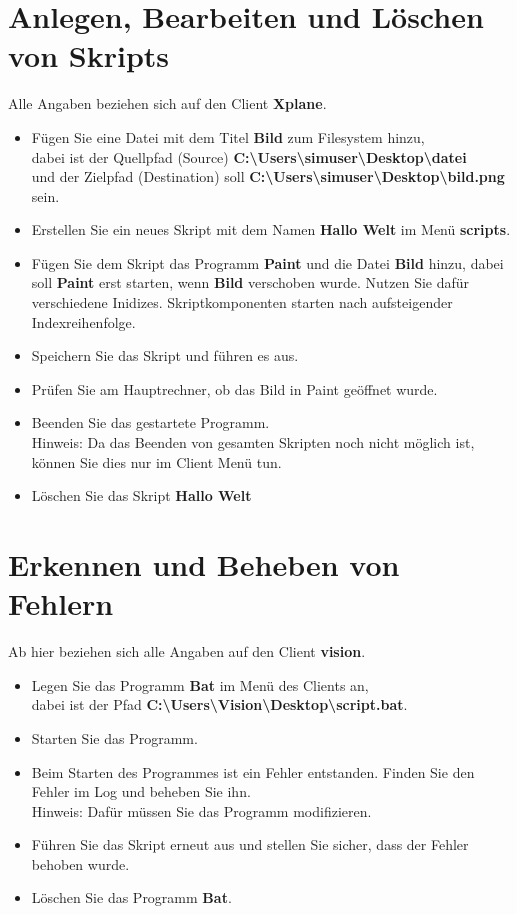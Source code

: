 \documentclass[accentcolor=tud1a,11pt]{tudexercise}
\begin{document}
\nutzerstudie
\section*{Anlegen, Bearbeiten und Löschen von Skripts}
Alle Angaben beziehen sich auf den Client \textbf{Xplane}.
\begin{itemize}
	\item Fügen Sie eine Datei mit dem Titel \textbf{Bild} zum Filesystem hinzu, \\
		dabei ist der Quellpfad (Source) \textbf{C:\textbackslash Users\textbackslash simuser\textbackslash Desktop\textbackslash datei} \\ 
		und der Zielpfad (Destination) soll \textbf{C:\textbackslash Users\textbackslash simuser\textbackslash Desktop\textbackslash bild.png} sein.
	\item Erstellen Sie ein neues Skript mit dem Namen \textbf{Hallo Welt} im Menü \textbf{scripts}.
	\item Fügen Sie dem Skript das Programm \textbf{Paint} und die Datei \textbf{Bild} hinzu, dabei soll \textbf{Paint} erst starten, wenn \textbf{Bild} verschoben wurde. Nutzen Sie dafür verschiedene Inidizes. Skriptkomponenten starten nach aufsteigender Indexreihenfolge.
	\item Speichern Sie das Skript und führen es aus.
	\item Prüfen Sie am Hauptrechner, ob das Bild in Paint geöffnet wurde.
	\item Beenden Sie das gestartete Programm. \\
		Hinweis: Da das Beenden von gesamten Skripten noch nicht möglich ist, können Sie dies nur im Client Menü tun.
	\item Löschen Sie das Skript \textbf{Hallo Welt}		
\end{itemize}
\section*{Erkennen und Beheben von Fehlern}
Ab hier beziehen sich alle Angaben auf den Client \textbf{vision}.
\begin{itemize}
	\item Legen Sie das Programm \textbf{Bat} im Menü des Clients an, \\
		dabei ist der Pfad \textbf{C:\textbackslash Users\textbackslash Vision\textbackslash Desktop\textbackslash script.bat}.
	\item Starten Sie das Programm.
	\item Beim Starten des Programmes ist ein Fehler entstanden. Finden Sie den Fehler im Log und beheben Sie ihn.\\
		Hinweis: Dafür müssen Sie das Programm modifizieren.
	\item Führen Sie das Skript erneut aus und stellen Sie sicher, dass der Fehler behoben wurde.
	\item Löschen Sie das Programm \textbf{Bat}.
\end{itemize}
\end{document}
